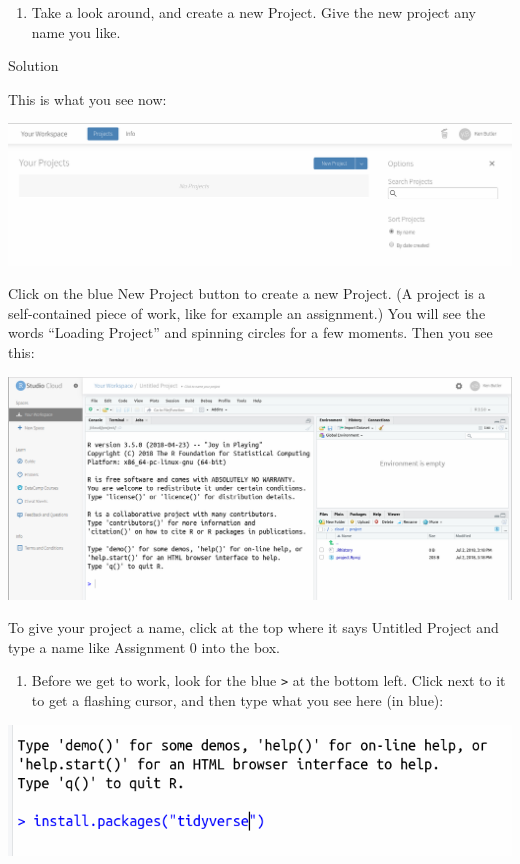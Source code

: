 \documentclass[]{tufte-book}
\providecommand{\tightlist}{%
  \setlength{\itemsep}{0pt}\setlength{\parskip}{0pt}}
\theoremstyle{definition}
\theoremstyle{definition}
\theoremstyle{definition}
\theoremstyle{remark}
\begin{document}
\begin{enumerate}
\def\labelenumi{(\alph{enumi})}
\setcounter{enumi}{2}
\tightlist
\item
  Take a look around, and create a new Project. Give the new project any
  name you like.
\end{enumerate}

Solution

This is what you see now:

\includegraphics{Screenshot_2018-07-02_15-08-07.png}

Click on the blue New Project button to create a new Project. (A project
is a self-contained piece of work, like for example an assignment.) You
will see the words ``Loading Project'' and spinning circles for a few
moments. Then you see this:

\includegraphics{Screenshot_2018-07-02_15-19-12.png}

To give your project a name, click at the top where it says Untitled
Project and type a name like Assignment 0 into the box.

\begin{enumerate}
\def\labelenumi{(\alph{enumi})}
\setcounter{enumi}{3}
\tightlist
\item
  Before we get to work, look for the blue \texttt{\textgreater{}} at
  the bottom left. Click next to it to get a flashing cursor, and then
  type what you see here (in blue):
\end{enumerate}

\includegraphics{Screenshot_2018-07-02_15-25-20.png}
\end{document}
